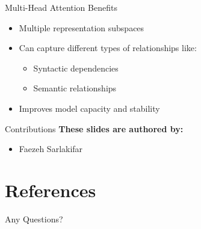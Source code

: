 \documentclass[serif, aspectratio=169]{beamer}
\begin{document}
%	

\begin{frame}{Multi-Head Attention Benefits}
    \begin{itemize}
        \item Multiple representation subspaces
        \item Can capture different types of relationships like:
        \begin{itemize}
            \item Syntactic dependencies
            \item Semantic relationships
        \end{itemize}
        \item Improves model capacity and stability
    \end{itemize}
\end{frame}

\begin{frame}{Contributions}
	\textbf{These slides are authored by:}
	\begin{itemize}
		\item Faezeh Sarlakifar
	\end{itemize}
	
\end{frame}


\section{References}

\begin{frame}[allowframebreaks]
    
    
    \nocite{*} %
\end{frame}


\begin{frame}
    \begin{center}
        {\Huge Any Questions?}
    \end{center}
\end{frame}
\end{document}
